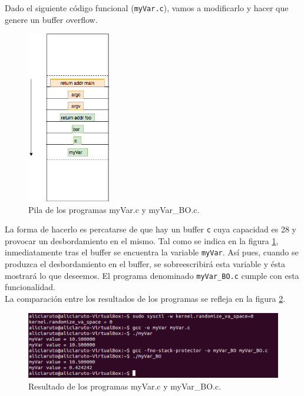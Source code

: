 \documentclass[a4,12pt,onecolum]{article}
\begin{document}
Dado el siguiente código funcional (\texttt{myVar.c}), vamos a modificarlo y hacer que genere un buffer overflow.



\begin{figure}[H]
\centering
\includegraphics[width=0.325\textwidth]{./images/BOstack.png}
\caption{Pila de los programas myVar.c y myVar\_BO.c.}
\label{fig:bo1}
\end{figure}

La forma de hacerlo es percatarse de que hay un buffer \texttt{c} cuya capacidad es 28 y provocar un desbordamiento en el mismo. Tal como se indica en la figura \ref{fig:bo1}, inmediatamente tras el buffer se encuentra la variable \texttt{myVar}. Así pues, cuando se produzca el desbordamiento en el buffer, se sobreescribirá esta variable y ésta mostrará lo que deseemos. El programa denominado \texttt{myVar\_BO.c} cumple con esta funcionalidad. \\

La comparación entre los resultados de los programas se refleja en la figura \ref{fig:bo2}. \\



\begin{figure}[htbp]
\centering
\includegraphics[width=1.0\textwidth]{./images/BOmyvar.png}
\caption{Resultado de los programas myVar.c y myVar\_BO.c.}
\label{fig:bo2}
\end{figure}
\end{document}
